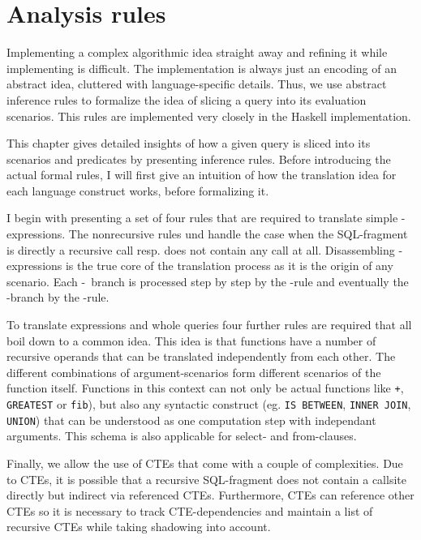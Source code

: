 \chapter{Analysis rules}



Implementing a complex algorithmic idea straight away and refining it while implementing is difficult. The implementation is always just an encoding of an abstract idea, cluttered with language-specific details. Thus, we use abstract inference rules to formalize the idea of slicing a query into its evaluation scenarios. This rules are implemented very closely in the Haskell implementation.

This chapter gives detailed insights of how a given query is sliced into its scenarios and predicates by presenting inference rules. Before introducing the actual formal rules, I will first give an intuition of how the translation idea for each language construct works, before formalizing it.

I begin with presenting a set of four rules that are required to translate simple \CASE-expressions. The nonrecursive rules \RREC und \RBASE handle the case when the SQL-fragment is directly a recursive call resp. does not contain any call at all. Disassembling \CASE-expressions is the true core of the translation process as it is the origin of any scenario. Each \WHEN-\THEN~branch is processed step by step by the \RWHEN-rule and eventually the \ELSE-branch by the \RELSE-rule.

To translate expressions and whole queries four further rules are required that all boil down to a common idea. This idea is that functions have a number of recursive operands that can be translated independently from each other. The different combinations of argument-scenarios form different scenarios of the function itself. Functions in this context can not only be actual functions like \texttt{+}, \texttt{GREATEST} or \texttt{fib}), but also any syntactic construct (eg. \texttt{IS BETWEEN}, \texttt{INNER JOIN}, \texttt{UNION}) that can be understood as one computation step with independant arguments. This schema is also applicable for select- and from-clauses.

Finally, we allow the use of CTEs that come with a couple of complexities. Due to CTEs, it is possible that a recursive SQL-fragment does not contain a callsite directly but indirect via referenced CTEs. Furthermore, CTEs can reference other CTEs so it is necessary to track CTE-dependencies and maintain a list of recursive CTEs while taking shadowing into account.

